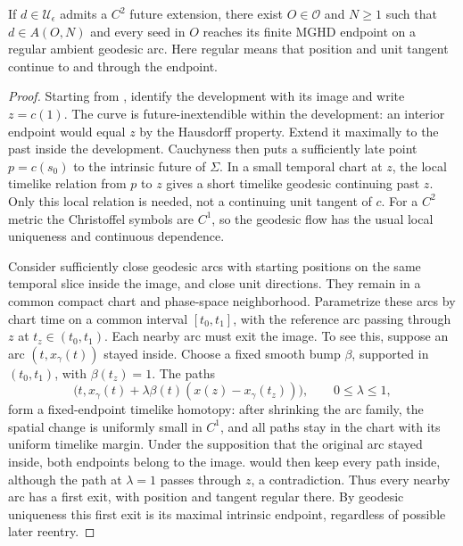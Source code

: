 \begin{proposition}\label{cat:regular-exit}
If \(d\in\mathcal U_\epsilon\) admits a \(C^2\) future extension,
there exist \(O\in\mathscr O\) and \(N\geq1\) such that
\(d\in A(O,N)\) and every seed in \(O\) reaches its finite MGHD
endpoint on a regular ambient geodesic arc. Here regular means that
position and unit tangent continue to and through the endpoint.
\end{proposition}
\begin{proof}
Starting from , identify the development with its image and
write \(z=c(1)\). The curve is future-inextendible within the
development: an interior endpoint would equal \(z\) by the Hausdorff
property. Extend it maximally to the past inside the development.
Cauchyness then puts a sufficiently late point \(p=c(s_0)\) to
the intrinsic future of \(\Sigma\). In a small temporal chart at
\(z\), the local timelike relation from \(p\) to \(z\) gives a
short timelike geodesic continuing past \(z\). Only this local
relation is needed, not a continuing unit tangent of \(c\).
For a \(C^2\) metric the Christoffel symbols are \(C^1\), so the
geodesic flow has the usual local uniqueness and continuous dependence.

Consider sufficiently close geodesic arcs with starting positions on
the same temporal slice inside the image, and close unit directions.
They remain in a common compact chart and phase-space neighborhood.
Parametrize these arcs by chart time on a common interval
\([t_0,t_1]\), with the reference arc passing through \(z\) at
\(t_z\in(t_0,t_1)\). Each nearby arc must exit the image. To see this,
suppose an arc \((t,x_\gamma(t))\) stayed inside. Choose a fixed smooth
bump \(\beta\), supported in \((t_0,t_1)\), with \(\beta(t_z)=1\).
The paths
\[
 \bigl(t,x_\gamma(t)+\lambda\beta(t)
                    (x(z)-x_\gamma(t_z))\bigr),\qquad 0\le\lambda\le1,
\]
form a fixed-endpoint timelike homotopy: after shrinking the arc family,
the spatial change is uniformly small in \(C^1\), and all paths stay
in the chart with its uniform timelike margin. Under the supposition
that the original arc stayed inside, both endpoints belong to the image.
 would then keep every path inside, although the
path at \(\lambda=1\) passes through \(z\), a contradiction.
Thus every nearby arc has a first exit, with position
and tangent regular there. By geodesic uniqueness this first exit is
its maximal intrinsic endpoint, regardless of possible later reentry.


\end{proof}
